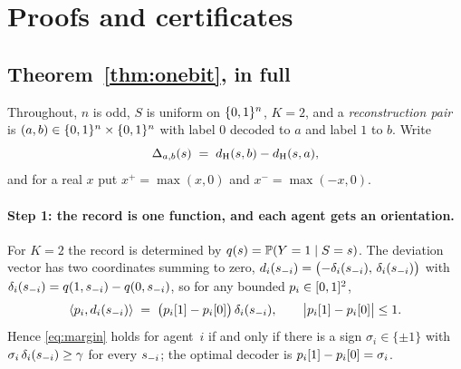 \section{Proofs and certificates}
\label{app:proofs}

\subsection{Theorem~\ref{thm:onebit}, in full}
\label{app:onebit}

Throughout, $n$ is odd, $S$ is uniform on $\{0,1\}^n$, $K = 2$, and a
\emph{reconstruction pair} is $(a,b) \in \{0,1\}^n \times \{0,1\}^n$ with label $0$
decoded to $a$ and label $1$ to $b$. Write
\[
  \Delta_{a,b}(s) \;=\; d_{\mathrm{H}}(s,b) - d_{\mathrm{H}}(s,a),
\]
and for a real $x$ put $x^+ = \max(x,0)$ and $x^- = \max(-x,0)$.

\paragraph{Step 1: the record is one function, and each agent gets an orientation.}
For $K = 2$ the record is determined by $q(s) = \mathbb{P}(Y = 1 \mid S = s)$. The
deviation vector has two coordinates summing to zero,
$d_i(s_{-i}) = \bigl(-\delta_i(s_{-i}),\, \delta_i(s_{-i})\bigr)$ with
$\delta_i(s_{-i}) = q(1,s_{-i}) - q(0,s_{-i})$, so for any bounded
$p_i \in [0,1]^2$,
\[
  \langle p_i, d_i(s_{-i})\rangle
  \;=\; \bigl(p_i[1] - p_i[0]\bigr)\,\delta_i(s_{-i}),
  \qquad \bigl|p_i[1]-p_i[0]\bigr| \le 1 .
\]
Hence \eqref{eq:margin} holds for agent~$i$ if and only if there is a sign
$\sigma_i \in \{\pm 1\}$ with $\sigma_i\,\delta_i(s_{-i}) \ge \gamma$ for every
$s_{-i}$; the optimal decoder is $p_i[1]-p_i[0] = \sigma_i$.

